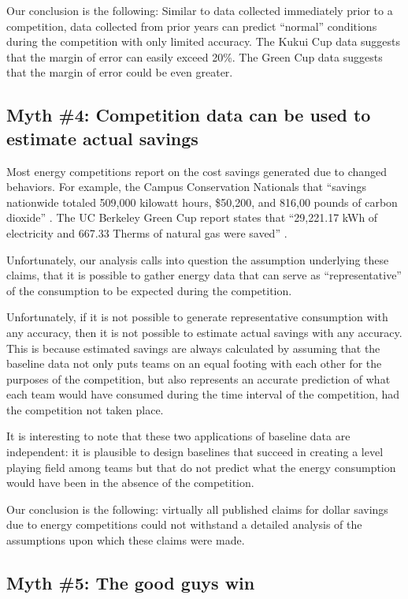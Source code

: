 \documentclass[jou]{apa} %
\begin{document}
Our conclusion is the following: Similar to data collected immediately prior to a
competition, data collected from prior years can predict ``normal'' conditions during the
competition with only limited accuracy.  The Kukui Cup data suggests that the margin of error can easily
exceed 20\%.  The Green Cup data suggests that the margin of error could be even greater. 


\subsection{Myth \#4: Competition data can be used to estimate actual savings}

Most energy competitions report on the cost savings generated due to changed behaviors.
For example, the Campus Conservation Nationals that ``savings nationwide totaled 509,000
kilowatt hours, \$50,200, and 816,00 pounds of carbon dioxide'' \cite{Willens2010}.  The UC
Berkeley Green Cup report states that ``29,221.17 kWh of electricity and 667.33 Therms of
natural gas were saved'' \cite{Dhong2011}.

Unfortunately, our analysis calls into question the assumption underlying these claims,
that it is possible to gather energy data that can serve as ``representative'' of the
consumption to be expected during the competition. 

Unfortunately, if it is not possible to generate representative consumption with any
accuracy, then it is not possible to estimate actual savings with any accuracy.  This is
because estimated savings are always calculated by assuming that the baseline data not
only puts teams on an equal footing with each other for the purposes of the competition,
but also represents an accurate prediction of what each team would have consumed during
the time interval of the competition, had the competition not taken place.  

It is interesting to note that these two applications of baseline data are
independent: it is plausible to design baselines that succeed in creating a
level playing field among teams but that do not predict what the energy
consumption would have been in the absence of the competition.

Our conclusion is the following: virtually all published claims for dollar savings due to
energy competitions could not withstand a detailed analysis of the assumptions upon which
these claims were made.  

\subsection{Myth \#5: The good guys win}
\end{document}
